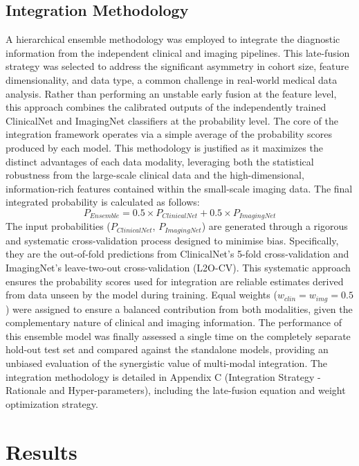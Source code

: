 \documentclass[12pt, a4paper]{article}
\begin{document}
\subsection{Integration Methodology}
A hierarchical ensemble methodology was employed to integrate the diagnostic information from the independent clinical and imaging pipelines. This late-fusion strategy was selected to address the significant asymmetry in cohort size, feature dimensionality, and data type, a common challenge in real-world medical data analysis. Rather than performing an unstable early fusion at the feature level, this approach combines the calibrated outputs of the independently trained ClinicalNet and ImagingNet classifiers at the probability level.
The core of the integration framework operates via a simple average of the probability scores produced by each model. This methodology is justified as it maximizes the distinct advantages of each data modality, leveraging both the statistical robustness from the large-scale clinical data and the high-dimensional, information-rich features contained within the small-scale imaging data. The final integrated probability is calculated as follows:
\begin{equation}
P_{Ensemble} = 0.5 \times P_{ClinicalNet} + 0.5 \times P_{ImagingNet}
\end{equation}
The input probabilities ($P_{ClinicalNet}$, $P_{ImagingNet}$) are generated through a rigorous and systematic cross-validation process designed to minimise bias. Specifically, they are the out-of-fold predictions from ClinicalNet's 5-fold cross-validation and ImagingNet's leave-two-out cross-validation (L2O-CV). This systematic approach ensures the probability scores used for integration are reliable estimates derived from data unseen by the model during training. Equal weights ($w_{clin}=w_{img}=0.5$) were assigned to ensure a balanced contribution from both modalities, given the complementary nature of clinical and imaging information. The performance of this ensemble model was finally assessed a single time on the completely separate hold-out test set and compared against the standalone models, providing an unbiased evaluation of the synergistic value of multi-modal integration.
The integration methodology is detailed in Appendix C (Integration Strategy - Rationale and Hyper-parameters), including the late-fusion equation and weight optimization strategy.

\section{Results}
\end{document}
